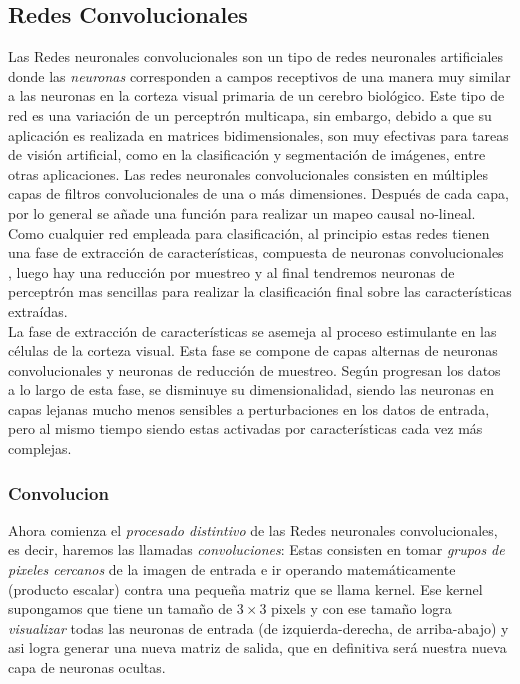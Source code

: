 \subsection{Redes Convolucionales}
\noindent
Las Redes neuronales convolucionales \cite{RedesConvolucionales} son  un tipo de redes neuronales artificiales  donde las \emph{neuronas}
corresponden a campos receptivos de una manera muy similar a las neuronas en la corteza visual primaria de un cerebro
biológico.  Este tipo de red es una variación de un perceptrón multicapa, sin embargo, debido a que su aplicación es realizada
en matrices bidimensionales, son muy efectivas para tareas de visión artificial, como en la clasificación y segmentación 
de imágenes, entre otras aplicaciones.
Las redes neuronales convolucionales consisten en múltiples capas de filtros convolucionales de una o más dimensiones. Después de
cada capa, por lo general se añade una función para realizar un mapeo causal no-lineal.\\
Como cualquier  red empleada para clasificación, al principio estas redes tienen una  fase de extracción de características,
compuesta de neuronas convolucionales , luego hay una reducción por muestreo y al final tendremos neuronas de perceptrón mas
sencillas para realizar la clasificación final sobre las características extraídas.\\
La fase de extracción de características se asemeja al proceso estimulante en las células de la corteza visual. Esta fase se
compone de capas alternas de neuronas convolucionales y neuronas de reducción de muestreo. Según progresan los datos a lo largo
de esta fase, se disminuye su dimensionalidad, siendo las neuronas en capas lejanas mucho menos sensibles a perturbaciones en
los datos de entrada, pero al mismo tiempo siendo estas activadas por características cada vez más complejas.\\

\subsubsection{Convolucion}
Ahora comienza el \emph{procesado distintivo} de las Redes neuronales convolucionales, es decir, haremos las llamadas
\emph{convoluciones}: Estas consisten en tomar \emph{grupos de pixeles cercanos} de la imagen de entrada e ir operando
matemáticamente (producto escalar) contra una pequeña matriz que se llama kernel.  Ese kernel supongamos que tiene un tamaño
de $3\times 3$ pixels y con ese tamaño logra \emph{visualizar} todas las neuronas de entrada (de izquierda-derecha, de arriba-abajo)
y asi logra generar una nueva matriz de salida, que en definitiva será nuestra nueva capa de neuronas ocultas.\\

